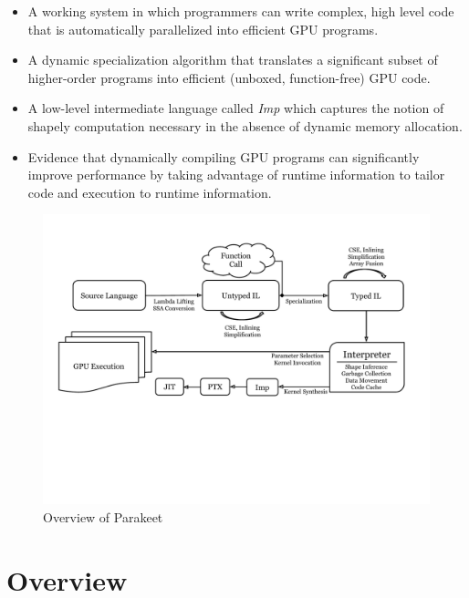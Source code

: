 \documentclass[preprint]{sigplanconf}
\begin{document}
\begin{itemize}
\item A working system in which programmers can write complex, high level code
that is automatically parallelized into efficient GPU programs.
\item A dynamic specialization algorithm that translates a significant subset of higher-order programs into efficient (unboxed, function-free) GPU code. 
\item A low-level intermediate language called \textit{Imp} which captures the notion of shapely computation \cite{Jay97} necessary in the absence of dynamic memory allocation.  
\item Evidence that dynamically compiling GPU programs can significantly
improve performance by taking advantage of runtime information to
tailor code and execution to runtime information.
\end{itemize}

\begin{figure}[t!bh]
\begin{center}
\leavevmode
\includegraphics[scale=0.6, trim=10pt 180pt 10pt 120pt]{Pipeline.pdf}
\end{center}
\caption{Overview of Parakeet}
\label{fig:overview}
\end{figure}
\section{Overview}
\end{document}
